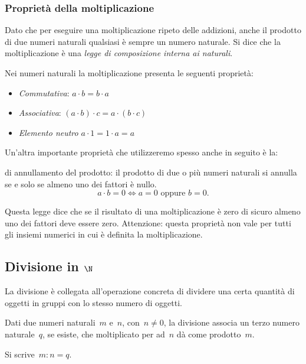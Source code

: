\subsubsection{Proprietà della moltiplicazione}

Dato che per eseguire una moltiplicazione ripeto delle addizioni, 
anche il prodotto di due numeri  naturali qualsiasi è sempre un numero 
naturale. 
Si dice che la moltiplicazione è una \emph{legge di composizione interna ai
naturali}. 

Nei numeri naturali la moltiplicazione presenta le seguenti proprietà:

\begin{itemize} [noitemsep]
 \item \emph{Commutativa}: \(a \cdot b = b \cdot a\)
 \item \emph{Associativa}: \((a \cdot b) \cdot c = a \cdot (b \cdot c)\)
 \item \emph{Elemento neutro} \(a \cdot 1 = 1 \cdot a = a\)
\end{itemize}

Un'altra importante proprietà che utilizzeremo spesso anche in seguito è la:

\begin{principio}{di annullamento del prodotto:}{}
il prodotto di due o più numeri naturali si annulla se e solo se almeno uno 
dei fattori è nullo.
\[ a\cdot b=0\Leftrightarrow a=0\text{ oppure }b=0. \]
\end{principio}

Questa legge dice che se il risultato di una moltiplicazione è zero di 
sicuro almeno uno dei fattori deve essere zero. Attenzione: questa proprietà 
non vale per tutti gli insiemi numerici in cui è definita la 
moltiplicazione.

\subsection{Divisione in $\N$}

La divisione è collegata all'operazione concreta di dividere una certa
quantità di oggetti in gruppi con lo stesso numero di oggetti.

\begin{definizione}{}{}
Dati due numeri naturali~\(m\) e~\(n\), con~\(n \neq 0\), la divisione 
associa 
un terzo numero naturale~\(q\), se esiste, che moltiplicato per ad~\(n\) dà 
come prodotto~\(m\).

Si scrive~\(m : n = q\).
\end{definizione}

